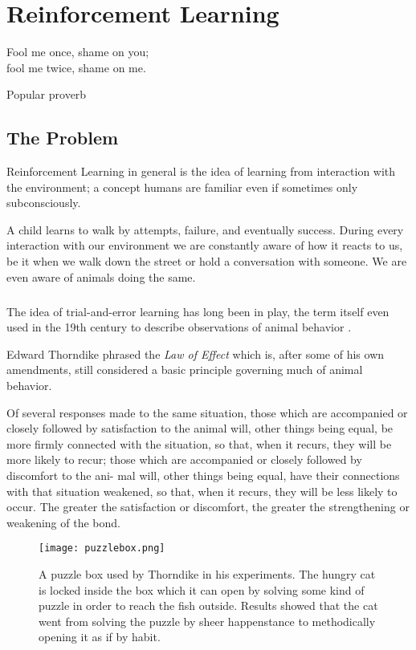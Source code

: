 \chapter{Reinforcement Learning}
\epigraph{
  Fool me once, shame on you; \\
  fool me twice, shame on me.
}{Popular proverb}


\section{The Problem}
Reinforcement Learning in general is
the idea of learning from interaction with the environment;
a concept humans are familiar even if sometimes only subconsciously.

A child learns to walk by attempts, failure,
and eventually success.
During every interaction with our environment
we are constantly aware of how it reacts to us,
be it when we walk down the street
or hold a conversation with someone.
We are even aware of animals doing the same.

\paragraph{}
The idea of trial-and-error learning has long been in play,
the term itself even used in the 19th century
to describe observations of animal behavior
\parencite{woodworth1938experimental}.

Edward Thorndike phrased the
\textit{Law of Effect}
which is,
after some of his own amendments,
still considered a basic principle
governing much of animal behavior.

\begin{displayquote}
Of several responses made to
the same situation, those which are accompanied or closely
followed by satisfaction to the animal will, other things being
equal, be more firmly connected with the situation, so that,
when it recurs, they will be more likely to recur; those which
are accompanied or closely followed by discomfort to the ani-
mal will, other things being equal, have their connections with
that situation weakened, so that, when it recurs, they will be
less likely to occur. The greater the satisfaction or discomfort,
the greater the strengthening or weakening of the bond.

\end{displayquote}

\begin{figure}[h]
  \centering
  \texttt{[image: puzzlebox.png]}
  \caption[Thorndike's cat puzzle box]{
    A puzzle box used by Thorndike in his experiments.
    The hungry cat is locked inside the box which it can open
    by solving some kind of puzzle
    in order to reach the fish outside.
    Results showed that the cat went from solving the puzzle by sheer happenstance
    to methodically opening it as if by habit.
  }
  \label{fig:puzzlebox}
\end{figure}

